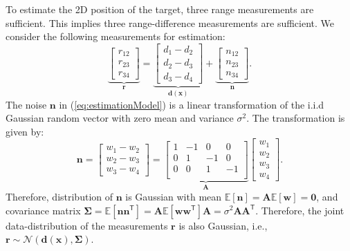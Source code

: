 \documentclass[11pt]{article}
\newcommand{\br}{\mathbf{r}}
\newcommand{\bd}{\mathbf{d}}
\newcommand{\bn}{\mathbf{n}}
\newcommand{\bx}{\mathbf{x}}
\newcommand{\bw}{\mathbf{w}}
\newcommand{\bA}{\mathbf{A}}
\newcommand{\Ex}{\mathbb{E}}
\newcommand{\TT}{\mathsf{T}}
\newcommand{\zerovec}{\boldsymbol{0}}
\newcommand{\bSigma}{\boldsymbol{\Sigma}}
\begin{document}
To estimate the 2D position of the target, three range measurements are sufficient. This implies three range-difference measurements are sufficient. We consider the following measurements for estimation:
\begin{equation}
	\underbrace{\begin{bmatrix}
		r_{12} \\ r_{23} \\ r_{34}
	\end{bmatrix}}_{\br} = 
	\underbrace{\begin{bmatrix}
		d_{1}-d_{2} \\ d_{2}-d_{3} \\ d_{3}-d_{4}
	\end{bmatrix}}_{\bd(\bx)} +
	\underbrace{\begin{bmatrix}
		n_{12} \\ n_{23} \\ n_{34}
	\end{bmatrix}}_{\bn}.
\label{eq:estimationModel}
\end{equation}
The noise $\bn$ in (\ref{eq:estimationModel}) is a linear transformation of the i.i.d Gaussian random vector with zero mean and variance $\sigma^{2}$. The transformation is given by:
\begin{equation}
	\bn = \begin{bmatrix}
		w_{1} - w_{2} \\ w_{2} - w_{3} \\ w_{3} - w_{4}
	\end{bmatrix} = 
	\underbrace{\begin{bmatrix}
		1 & -1 & 0 & 0 \\
		0 & 1 & -1 & 0 \\
		0 & 0 & 1 & -1 \\
	\end{bmatrix}}_{\bA}
	\begin{bmatrix}
		w_{1} \\ w_{2} \\ w_{3} \\ w_{4}
	\end{bmatrix}.
\label{eq:noiseModel}
\end{equation}
Therefore, distribution of $\bn$ is Gaussian with mean $\Ex \left[ \bn \right] = \bA \Ex \left[ \bw \right] = \zerovec$, and covariance matrix $\bSigma = \Ex \left[ \bn \bn^{\TT} \right] = \bA \Ex \left[ \bw \bw^{\TT} \right] \bA = \sigma^{2} \bA \bA^{\TT}$. Therefore, the joint data-distribution of the measurements $\br$ is also Gaussian, i.e., $\br \sim \mathcal{N} \left( \bd(\bx), \bSigma \right)$.
\end{document}
